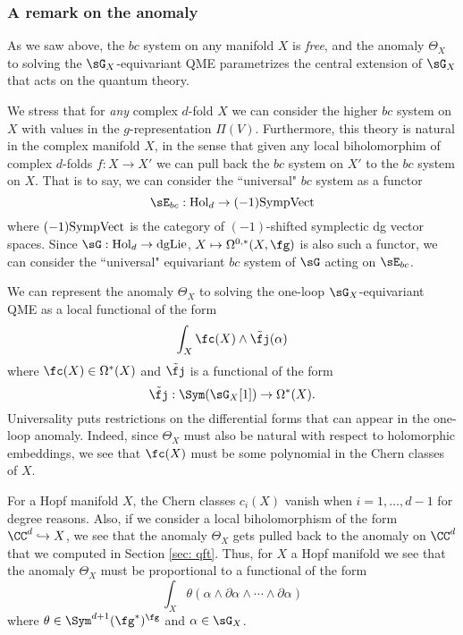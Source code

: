 
\subsubsection{A remark on the anomaly}\label{sec: hopfobs}

As we saw above, the $bc$ system on any manifold $X$ is {\em free}, and the anomaly $\Theta_X$ to solving the $\sG_X$-equivariant QME parametrizes the central extension of $\sG_X$ that acts on the quantum theory.


We stress that for {\em any} complex $d$-fold $X$ we can consider the higher $bc$ system on $X$ with values in the $g$-representation $\Pi(V)$. 
Furthermore, this theory is natural in the complex manifold $X$, in the sense that given any local biholomorphim of complex $d$-folds $f : X \to X'$ we can pull back the $bc$ system on $X'$ to the $bc$ system on $X$. 
That is to say, we can consider the ``universal" $bc$ system as a functor
\[
\sE_{bc} : {\rm Hol}_d \to (-1){\rm SympVect}
\]
where $(-1){\rm SympVect}$ is the category of $(-1)$-shifted symplectic dg vector spaces. 
Since $\sG : {\rm Hol}_d \to {\rm dgLie}$, $X \mapsto \Omega^{0,*}(X, \fg)$ is also such a functor, we can consider the ``universal" equivariant $bc$ system of $\sG$ acting on $\sE_{bc}$. 

We can represent the anomaly $\Theta_X$ to solving the one-loop $\sG_X$-equivariant QME as a local functional of the form
\[
\int_X \fc(X) \wedge \Tilde{\fj}(\alpha)
\]
where $\fc(X) \in \Omega^*(X)$ and $\Tilde{\fj}$ is a functional of the form
\[
\Tilde{\fj} : \Sym(\sG_X[1]) \to \Omega^*(X) .
\]
Universality puts restrictions on the differential forms that can appear in the one-loop anomaly. 
Indeed, since $\Theta_X$ must also be natural with respect to holomorphic embeddings, we see that $\fc(X)$ must be some polynomial in the Chern classes of $X$. 

For a Hopf manifold $X$, the Chern classes $c_i(X)$ vanish when $i=1,\ldots,d-1$ for degree reasons. 
Also, if we consider a local biholomorphism of the form $\CC^d \hookrightarrow X$, we see that the anomaly $\Theta_X$ gets pulled back to the anomaly on $\CC^d$ that we computed in Section \ref{sec: qft}. 
Thus, for $X$ a Hopf manifold we see that the anomaly $\Theta_X$ must be proportional to a functional of the form
\[
\int_X \theta(\alpha \wedge \partial \alpha \wedge \cdots \wedge \partial \alpha)
\]
where $\theta \in \Sym^{d+1}(\fg^*)^\fg$ and $\alpha \in \sG_X$. 

